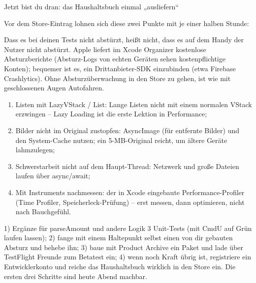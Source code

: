 \begin{tcbpractice}{Jetzt bist du dran: das Haushaltsbuch einmal „ausliefern“}

Vor dem Store-Eintrag lohnen sich diese zwei Punkte mit je einer halben Stunde:


Dass es bei deinen Tests nicht abstürzt, heißt nicht, dass es auf dem Handy der Nutzer nicht abstürzt. Apple liefert im Xcode Organizer kostenlose Absturzberichte (Absturz-Logs von echten Geräten sehen kostenpflichtige Konten); bequemer ist es, ein Drittanbieter-SDK einzubinden (etwa Firebase Crashlytics). Ohne Absturzüberwachung in den Store zu gehen, ist wie mit geschlossenen Augen Autofahren.


\begin{enumerate}
  \item Listen mit LazyVStack / List: Lange Listen nicht mit einem normalen VStack erzwingen – Lazy Loading ist die erste Lektion in Performance;
  \item Bilder nicht im Original zustopfen: AsyncImage (für entfernte Bilder) und den System-Cache nutzen; ein 5-MB-Original reicht, um ältere Geräte lahmzulegen;
  \item Schwerstarbeit nicht auf dem Haupt-Thread: Netzwerk und große Dateien laufen über async/await;
  \item Mit Instruments nachmessen: der in Xcode eingebaute Performance-Profiler (Time Profiler, Speicherleck-Prüfung) – erst messen, dann optimieren, nicht nach Bauchgefühl.
\end{enumerate}

1) Ergänze für parseAmount und andere Logik 3 Unit-Tests (mit CmdU auf Grün laufen lassen); 2) fange mit einem Haltepunkt selbst einen von dir gebauten Absturz und behebe ihn; 3) baue mit Product Archive ein Paket und lade über TestFlight Freunde zum Betatest ein; 4) wenn noch Kraft übrig ist, registriere ein Entwicklerkonto und reiche das Haushaltsbuch wirklich in den Store ein. Die ersten drei Schritte sind heute Abend machbar.

\end{tcbpractice}

